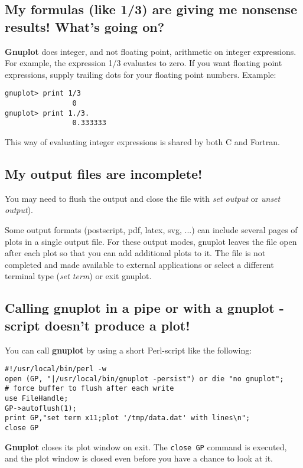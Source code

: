 \documentclass[a4paper,11pt]{article}
\newcommand{\gnuplot}{\textbf{gnuplot }}
\newcommand{\Gnuplot}{\textbf{Gnuplot }}
\begin{document}
\subsection{My formulas (like 1/3) are giving me nonsense results! What's going on?}

\Gnuplot{} does integer, and not floating point, arithmetic on
integer expressions. For example, the expression 1/3 evaluates
to zero. If you want floating point expressions, supply
trailing dots for your floating point numbers. Example:


\small
\begin{verbatim}
gnuplot> print 1/3
                0
gnuplot> print 1./3.
                0.333333
\end{verbatim}
\normalsize

This way of evaluating integer expressions is shared by both C and Fortran.


\subsection{My output files are incomplete!}

You may need to flush the output and close the file with
{\em set output} or {\em unset output}).

Some output formats (postscript, pdf, latex, svg, ...) can include several
pages of plots in a single output file.  For these output modes, gnuplot
leaves the file open after each plot so that you can add additional plots
to it.  The file is not completed and made available to external applications
or select a different terminal type ({\em set term}) or exit gnuplot.


\subsection{Calling \gnuplot in a pipe or with a \gnuplot-script
doesn't produce a plot!}

You can call \gnuplot by using a short Perl-script like the
following:
\small
\begin{verbatim}
#!/usr/local/bin/perl -w
open (GP, "|/usr/local/bin/gnuplot -persist") or die "no gnuplot";
# force buffer to flush after each write
use FileHandle;
GP->autoflush(1);
print GP,"set term x11;plot '/tmp/data.dat' with lines\n";
close GP
\end{verbatim}
\normalsize

\Gnuplot{} closes its plot window on exit. The \verb+close GP+
command is executed, and the plot window is closed even before you have
a chance to look at it.
\end{document}
